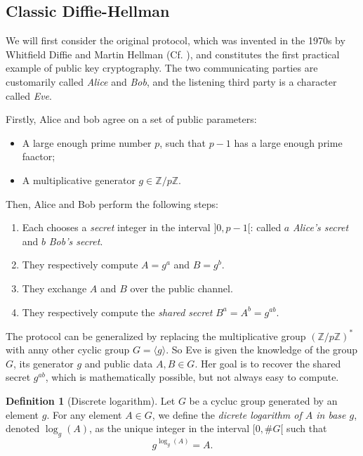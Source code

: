 \documentclass{article}
\theoremstyle{theorem}
\theoremstyle{definition}
\newtheorem{definition}{Definition}
\begin{document}
\subsection{Classic Diffie-Hellman}

We will first consider the original protocol, which was invented in the 1970s by Whitfield Diffie and Martin Hellman (Cf. \cite{DiffieHellman}), and constitutes the first practical example of public key cryptography. The two communicating parties are customarily called \textit{Alice} and \textit{Bob}, and the listening third party is a character called \textit{Eve}. 

Firstly, Alice and bob agree on a set of public parameters:
	\begin{itemize}
		\item A large enough prime number $p$, such that $p - 1$ has a large enough prime faactor;
		
		\item A multiplicative generator $g \in \mathbb{Z}/p\mathbb{Z}$.
		
	\end{itemize}
Then, Alice and Bob perform the following steps:
	
	\begin{enumerate}
		\item Each chooses a \textit{secret} integer in the interval $]0, p - 1[$: called $a$ \textit{Alice's secret} and $b$ \textit{Bob's secret}.
		
		\item They respectively compute $A = g^a$ and $B = g^b$.
		
		\item They exchange $A$ and $B$ over the public channel.
		
		\item They respectively compute the \textit{shared secret} $B^a = A^b = g^{ab}$.
	\end{enumerate}

The protocol can be generalized by replacing the multiplicative group $(\mathbb{Z}/p\mathbb{Z})^{\ast}$ with anny other cyclic group $G = \langle g \rangle$. So Eve is given the knowledge of the group $G$, its generator $g$ and public data $A, B \in G$. Her goal is to recover the shared secret $g^{ab}$, which is mathematically possible, but not always easy to compute.

\begin{definition}[Discrete logarithm]
	Let $G$ be a cycluc group generated by an element $g$. For any element $A \in G$, we define the \textit{dicrete logarithm of $A$ in base $g$}, denoted $\log_g(A)$, as the unique integer in the interval $[0, \#G[$ such that
		\[ g^{\log_g(A)} = A. \] 
\end{definition}
\end{document}
